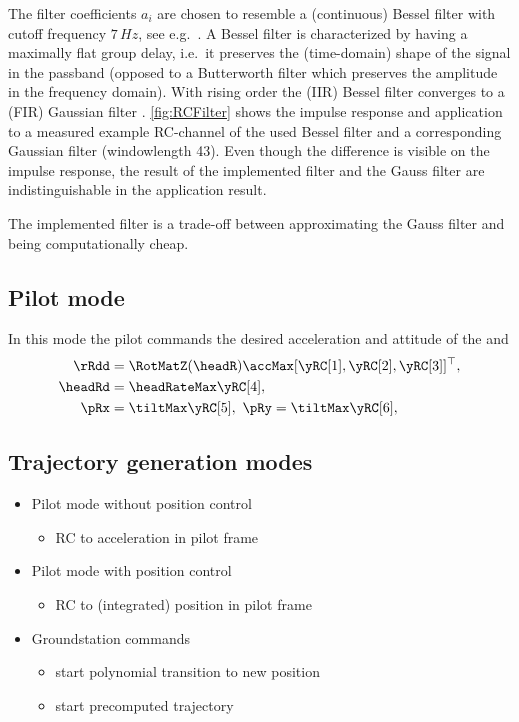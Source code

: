 The filter coefficients $a_i$ are chosen to resemble a (continuous) Bessel filter with cutoff frequency $7\,\unit{Hz}$, see e.g.\ \cite[sec.\,13.1.3]{TietzeSchenk:Halbleiter-Schaltungstechnik}.
A Bessel filter is characterized by having a maximally flat group delay, i.e.\ it preserves the (time-domain) shape of the signal in the passband (opposed to a Butterworth filter which preserves the amplitude in the frequency domain).
With rising order the (IIR) Bessel filter converges to a (FIR) Gaussian filter \cite[sec.\ 4.9.2]{Rabiner:DSP}.
\autoref{fig:RCFilter} shows the impulse response and application to a measured example RC-channel of the used Bessel filter and a corresponding Gaussian filter (windowlength 43).
Even though the difference is visible on the impulse response, the result of the implemented filter and the Gauss filter are indistinguishable in the application result.


The implemented filter is a trade-off between approximating the Gauss filter and being computationally cheap.

\subsection{Pilot mode}
In this mode the pilot commands the desired acceleration and attitude of the \Multicopter and 
\begin{align}
 \rRdd &= \RotMatZ(\headR) \accMax [\yRC[1], \yRC[2], \yRC[3]]^\top, 
\\
 \headRd &= \headRateMax \yRC[4],
\\
 \pRx &= \tiltMax \yRC[5], \ \pRy = \tiltMax \yRC[6],
\end{align}



\subsection{Trajectory generation modes}
\begin{itemize}
 \item Pilot mode without position control
 \begin{itemize}
  \item RC to acceleration in pilot frame
 \end{itemize}
 \item Pilot mode with position control
 \begin{itemize}
  \item RC to (integrated) position in pilot frame
 \end{itemize}
 \item Groundstation commands
 \begin{itemize}
  \item start polynomial transition to new position
  \item start precomputed trajectory
 \end{itemize}
\end{itemize}


